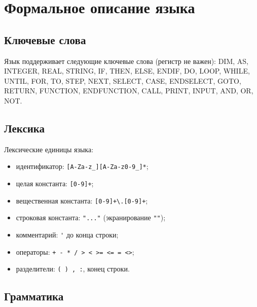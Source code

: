 \documentclass[14pt,a4paper]{article}
\begin{document}
\section{Формальное описание языка}

\subsection{Ключевые слова}

Язык поддерживает следующие ключевые слова (регистр не важен):
DIM, AS, INTEGER, REAL, STRING, IF, THEN, ELSE, ENDIF, DO, LOOP,
WHILE, UNTIL, FOR, TO, STEP, NEXT, SELECT, CASE, ENDSELECT, GOTO,
RETURN, FUNCTION, ENDFUNCTION, CALL, PRINT, INPUT, AND, OR, NOT.

\subsection{Лексика}

Лексические единицы языка:
\begin{itemize}
  \item идентификатор: \verb|[A-Za-z_][A-Za-z0-9_]*|;
  \item целая константа: \verb|[0-9]+|;
  \item вещественная константа: \verb|[0-9]+\.[0-9]+|;
  \item строковая константа: \verb|"..."| (экранирование \verb|""|);
  \item комментарий: \verb|'| до конца строки;
  \item операторы: \verb|+ - * / > < >= <= = <>|;
  \item разделители: \verb|( ) , :|, конец строки.
\end{itemize}

\subsection{Грамматика}
\end{document}
